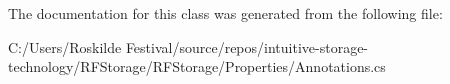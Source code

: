 \begin{DoxyCode}{0}
\DoxyCodeLine{\}}
\end{DoxyCode}


The documentation for this class was generated from the following file\+:\begin{DoxyCompactItemize}
\item 
C\+:/\+Users/\+Roskilde Festival/source/repos/intuitive-\/storage-\/technology/\+R\+F\+Storage/\+R\+F\+Storage/\+Properties/Annotations.\+cs\end{DoxyCompactItemize}
